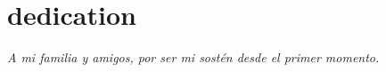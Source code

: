 \chapter*{dedication}
\begin{flushright}
\textit{
A mi familia y amigos, por ser mi sostén desde el primer momento.}
\end{flushright}